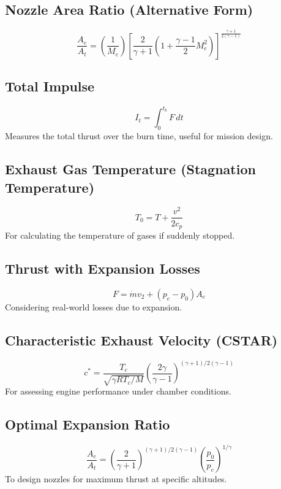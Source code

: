 \documentclass[12pt]{report}
\begin{document}
\subsection{Nozzle Area Ratio (Alternative Form)}
\begin{equation}
\frac{A_e}{A_t} = \left(\frac{1}{M_e}\right) \left[\frac{2}{\gamma+1} \left(1 + \frac{\gamma-1}{2} M_e^2 \right)\right]^{\frac{\gamma+1}{2(\gamma-1)}} \label{eq:nozzle_area_ratio}
\end{equation}

\subsection{Total Impulse}
\begin{equation}
I_t = \int_0^{t_b} F \, dt \label{eq:total_impulse}
\end{equation}
Measures the total thrust over the burn time, useful for mission design.

\subsection{Exhaust Gas Temperature (Stagnation Temperature)}
\begin{equation}
T_0 = T + \frac{v^2}{2c_p} \label{eq:stagnation_temperature}
\end{equation}
For calculating the temperature of gases if suddenly stopped.

\subsection{Thrust with Expansion Losses}
\begin{equation}
F = \dot{m}v_2 + (p_e - p_0)A_e \label{eq:thrust_with_losses}
\end{equation}
Considering real-world losses due to expansion.

\subsection{Characteristic Exhaust Velocity (CSTAR)}
\begin{equation}
c^* = \frac{T_c}{\sqrt{\gamma R T_c / M}} \left(\frac{2\gamma}{\gamma-1}\right)^{(\gamma+1)/2(\gamma-1)} \label{eq:cstar}
\end{equation}
For assessing engine performance under chamber conditions.

\subsection{Optimal Expansion Ratio}
\begin{equation}
\frac{A_e}{A_t} = \left(\frac{2}{\gamma+1}\right)^{(\gamma+1)/2(\gamma-1)} \left(\frac{p_0}{p_e}\right)^{1/\gamma} \label{eq:optimal_expansion}
\end{equation}
To design nozzles for maximum thrust at specific altitudes.
\end{document}
